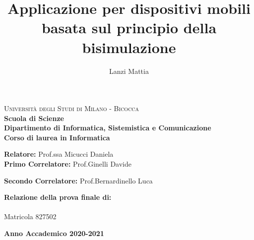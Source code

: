 \documentclass[a4paper,12pt,twoside,openright]{report}
\title{Applicazione per dispositivi mobili basata sul principio della bisimulazione}
\author{Lanzi Mattia}
\makeatletter
\let\inserttitle\@title
\let\insertauthor\@author
\makeatother
\begin{document}
\begin{titlepage}
\noindent
\begin{minipage}[t]{0.19\textwidth}
\end{minipage}

\begin{minipage}[t]{0.81\textwidth}
	{
                {\textsc{Università degli Studi di Milano - Bicocca}} \\
                \textbf{Scuola di Scienze} \\
                \textbf{Dipartimento di Informatica, Sistemistica e Comunicazione} \\
                \textbf{Corso di laurea in Informatica} \\
                \par
        }
\end{minipage}
 
\vspace{40mm}
        
\begin{center}
	 {\LARGE{
                    \textbf{\inserttitle}
                    \par
            }}
        \end{center}
        
        \vspace{50mm}

        \noindent
        {\large \textbf{Relatore:} Prof.ssa Micucci Daniela} \\

        \noindent
        {\large \textbf{Primo Correlatore:} Prof.Ginelli Davide}

	\noindent
        	{\large \textbf{Secondo Correlatore:} Prof.Bernardinello Luca}
        
        \vspace{15mm}

        \begin{flushright}
            {\large \textbf{Relazione della prova finale di:}} \\
            \large{\insertauthor} \\
            \large{Matricola 827502} 
        \end{flushright}
        
        \vspace{40mm}
        \begin{center}
            {\large{\bf Anno Accademico 2020-2021}}
        \end{center}     
\end{titlepage}
\end{document}
